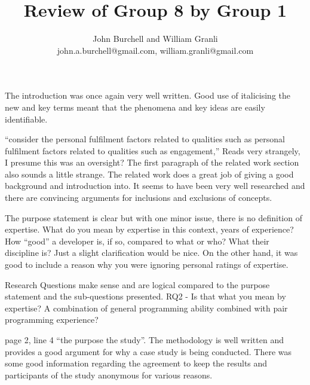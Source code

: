 \documentclass[times, 10pt,twocolumn]{article}
\begin{document}
\title{Review of Group 8 by Group 1}

\author{John Burchell and William Granli \\
john.a.burchell@gmail.com, william.granli@gmail.com}



\maketitle
\thispagestyle{empty}







The introduction was once again very well written. Good use of italicising the new and key terms meant that the phenomena and key ideas are easily identifiable. 

``consider the personal fulfilment factors related to qualities such as personal fulfilment factors related to qualities such as engagement,'' Reads very strangely, I presume this was an oversight? The first paragraph of the related work section also sounds a little strange. The related work does a great job of giving a good background and introduction into. It seems to have been very well researched and there are convincing arguments for inclusions and exclusions of concepts.


The purpose statement is clear but with one minor issue, there is no definition of expertise. What do you mean by expertise in this context, years of experience? How ``good'' a developer is, if so, compared to what or who? What their discipline is? Just a slight clarification would be nice. On the other hand, it was good to include a reason why you were ignoring personal ratings of expertise.

Research Questions make sense and are logical compared to the purpose statement and the sub-questions presented.
RQ2 - Is that what you mean by expertise? A combination of general programming ability combined with pair programming experience?

page 2, line 4 ``the purpose the study''.
The methodology is well written and provides a good argument for why a case study is being conducted. There was some good information regarding the agreement to keep the results and participants of the study anonymous for various reasons.
\end{document}
